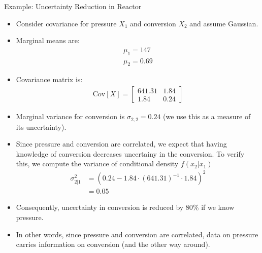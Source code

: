 \documentclass[9pt]{beamer}
\begin{document}
%
\begin{frame}{Example: Uncertainty Reduction in Reactor}

\begin{itemize}
\item Consider covariance for pressure $X_1$ and conversion $X_2$ and assume Gaussian.
\item Marginal means are:
\begin{align*}
\mu_1=147\\
\mu_2=0.69
\end{align*}
\item Covariance matrix is:
\begin{align*}
\textrm{Cov}[X]=\left[\begin{array}{cc}  641.31    &      1.84\\
          1.84     &     0.24\end{array}\right]
\end{align*}
\item Marginal variance for conversion is $\sigma_{2,2}=0.24$ (we use this as a measure of its uncertainty).

\item Since pressure and conversion are correlated, we expect that having knowledge of conversion decreases uncertainy in the conversion. To verify this, we compute the variance of conditional density $f(x_2|x_1)$
\begin{align*}
\sigma_{2|1}^2&=(0.24-1.84\cdot (641.31)^{-1}\cdot 1.84)^2\\
&=0.05
\end{align*}
\item Consequently, uncertainty in conversion is reduced by 80\% if we know pressure.  
\item In other words,  since pressure and conversion are correlated, data on pressure carries information on conversion (and the other way around). 

\end{itemize}

\end{frame}
\end{document}
